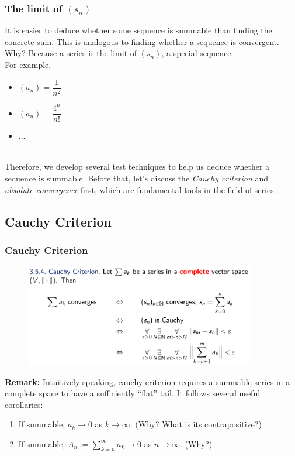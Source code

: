 \documentclass[10pt, t]{beamer}
\renewcommand{\emph}[1]{{\color{themecolor}\textsl{#1}}}
\newcommand{\nullspace}{~\\[15pt]}
\begin{document}
\begin{frame}
    \frametitle{The limit of $(s_n)$}

    It is easier to deduce whether some sequence is summable than finding the concrete sum. This is analogous to finding whether a sequence is convergent. Why? Because a series is the limit of $(s_n)$, a special sequence.
    \nullspace
    For example,
    \begin{itemize}
        \item $(a_n)=\dfrac{1}{n^2}$
        \item $(a_n)=\dfrac{4^n}{n!}$
        \item ...
    \end{itemize}
    \nullspace
    Therefore, we develop several test techniques to help us deduce whether a sequence is summable. Before that, let's discuss the \emph{Cauchy criterion }and \emph{absolute convergence} first, which are fundamental tools in the field of series.
\end{frame}

\subsection{Cauchy Criterion}
\begin{frame}
    \frametitle{Cauchy Criterion}

    \begin{figure}[H]
        \centering
        \includegraphics[width=0.9\textwidth]{2020-11-11-13-40-03.png}
    \end{figure}
    \textbf{Remark:} Intuitively speaking, cauchy criterion requires a summable series in a complete space to have a sufficiently ``flat'' tail. It follows several useful corollaries:
    \begin{enumerate}
        \item If summable, $a_k\to 0$ as $k\to \infty$. (Why? What is its contrapositive?)
        \item If summable, $A_n:=\sum_{k=n}^\infty a_k\to 0$ as $n\to \infty$. (Why?) 
    \end{enumerate}
\end{frame}
\end{document}
